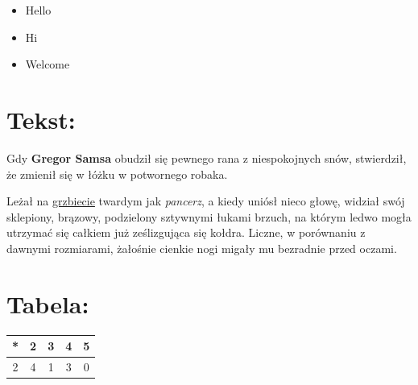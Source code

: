 \documentclass[12pt]{article}
\begin{document}
\vspace{2mm}

\begin{itemize}
    \item Hello
    \item Hi
    \item Welcome
\end{itemize}

\section{Tekst:}
Gdy \textbf{Gregor Samsa} obudził się pewnego rana z niespokojnych snów, stwierdził, że zmienił się w łóżku w potwornego robaka.

Leżał na \underline{grzbiecie} twardym jak \emph{pancerz}, a kiedy uniósł nieco głowę, widział swój sklepiony, brązowy, podzielony sztywnymi łukami brzuch, na którym ledwo mogła utrzymać się całkiem już ześlizgująca się kołdra. Liczne, w porównaniu z dawnymi rozmiarami, żałośnie cienkie nogi migały mu bezradnie przed oczami.

\section{Tabela:}
\begin{table}[h!]
    \centering
    \begin{tabular}{|c|c|c|c|c|}
    \hline
    * & 2 & 3 & 4 & 5 \\ \hline
    2 & 4 & 1 & 3 & 0 \\ \hline
    \end{tabular}
\end{table}
\end{document}

